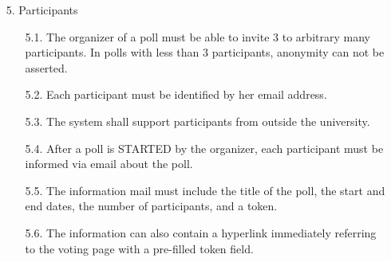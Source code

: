 \begin{enumerate}
%
%	
%	
%	
%	
%	
%	




\item[5.] Participants

	\begin{enumerate}
	\item[5.1.] The organizer of a poll must be able to invite 3 to arbitrary many participants. In polls with
	less than 3 participants, anonymity can not be asserted. %
	
	
	\item[5.2.] Each participant must be identified by her email address. %
	
	
	\item[5.3.] The system shall support participants from outside the university. %
	
	
	\item[5.4.] After a poll is STARTED by the organizer, each participant must be informed via email about
	the poll. %
	
	
	\item[5.5.] The information mail must include the title of the poll, the start and end dates, the number of
	participants, and a token. %
	
	
	\item[5.6.] The information can also contain a hyperlink immediately referring to the voting page with a
	pre-filled token field. %
	\end{enumerate}





\end{enumerate}
